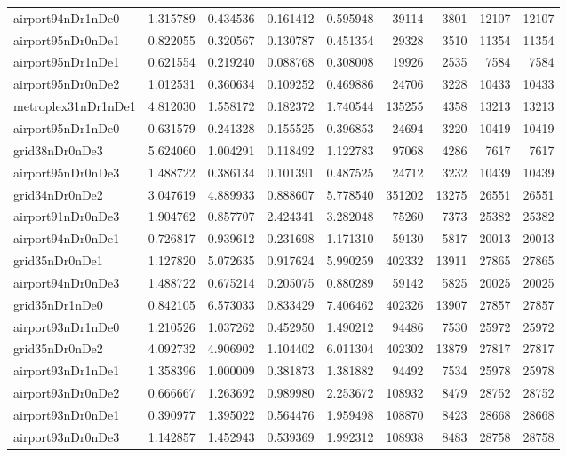 \begin{longtable}{|l|r|r|r|r|r|r|r|r|}
airport94nDr1nDe0 & 1.315789 & 0.434536 & 0.161412 & 0.595948 & 39114 & 3801 & 12107 & 12107 \\
airport95nDr0nDe1 & 0.822055 & 0.320567 & 0.130787 & 0.451354 & 29328 & 3510 & 11354 & 11354 \\
airport95nDr1nDe1 & 0.621554 & 0.219240 & 0.088768 & 0.308008 & 19926 & 2535 & 7584 & 7584 \\
airport95nDr0nDe2 & 1.012531 & 0.360634 & 0.109252 & 0.469886 & 24706 & 3228 & 10433 & 10433 \\
metroplex31nDr1nDe1 & 4.812030 & 1.558172 & 0.182372 & 1.740544 & 135255 & 4358 & 13213 & 13213 \\
airport95nDr1nDe0 & 0.631579 & 0.241328 & 0.155525 & 0.396853 & 24694 & 3220 & 10419 & 10419 \\
grid38nDr0nDe3 & 5.624060 & 1.004291 & 0.118492 & 1.122783 & 97068 & 4286 & 7617 & 7617 \\
airport95nDr0nDe3 & 1.488722 & 0.386134 & 0.101391 & 0.487525 & 24712 & 3232 & 10439 & 10439 \\
grid34nDr0nDe2 & 3.047619 & 4.889933 & 0.888607 & 5.778540 & 351202 & 13275 & 26551 & 26551 \\
airport91nDr0nDe3 & 1.904762 & 0.857707 & 2.424341 & 3.282048 & 75260 & 7373 & 25382 & 25382 \\
airport94nDr0nDe1 & 0.726817 & 0.939612 & 0.231698 & 1.171310 & 59130 & 5817 & 20013 & 20013 \\
grid35nDr0nDe1 & 1.127820 & 5.072635 & 0.917624 & 5.990259 & 402332 & 13911 & 27865 & 27865 \\
airport94nDr0nDe3 & 1.488722 & 0.675214 & 0.205075 & 0.880289 & 59142 & 5825 & 20025 & 20025 \\
grid35nDr1nDe0 & 0.842105 & 6.573033 & 0.833429 & 7.406462 & 402326 & 13907 & 27857 & 27857 \\
airport93nDr1nDe0 & 1.210526 & 1.037262 & 0.452950 & 1.490212 & 94486 & 7530 & 25972 & 25972 \\
grid35nDr0nDe2 & 4.092732 & 4.906902 & 1.104402 & 6.011304 & 402302 & 13879 & 27817 & 27817 \\
airport93nDr1nDe1 & 1.358396 & 1.000009 & 0.381873 & 1.381882 & 94492 & 7534 & 25978 & 25978 \\
airport93nDr0nDe2 & 0.666667 & 1.263692 & 0.989980 & 2.253672 & 108932 & 8479 & 28752 & 28752 \\
airport93nDr0nDe1 & 0.390977 & 1.395022 & 0.564476 & 1.959498 & 108870 & 8423 & 28668 & 28668 \\
airport93nDr0nDe3 & 1.142857 & 1.452943 & 0.539369 & 1.992312 & 108938 & 8483 & 28758 & 28758 \\

\end{longtable}
